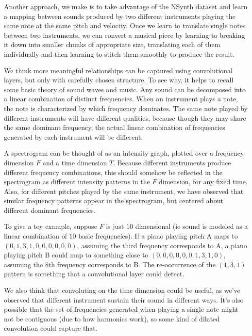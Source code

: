\documentclass{article}
\begin{document}
Another approach, we make is to take advantage of the NSynth dataset and learn a mapping between sounds produced by two different instruments playing the same note at the same pitch and velocity. Once we learn to translate single notes between two instruments, we can convert a musical piece by learning to breaking it down into smaller chunks of appropriate size, translating each of them individually and then learning to stitch them smoothly to produce the result.

We think more meaningful relationships can be captured using convolutional layers, but only with carefully chosen structure.
To see why, it helps to recall some basic theory of sound waves and music.
Any sound can be decomposed into a linear combination of distinct frequencies.
When an instrument plays a note, the note is characterized by which frequency dominates.
The same note played by different instruments will have different qualities, because though they may share the same dominant frequency, the actual linear combination of frequencies generated by each instrument will be different.

A spectrogram can be thought of as an intensity graph, plotted over a frequency dimension $F$ and a time dimension $T$.
Because different instruments produce different frequency combinations, this should somehow be reflected in the spectrogram as different intensity patterns in the $F$ dimension, for any fixed time.
Also, for different pitches played by the same instrument, we have observed that similar frequency patterns appear in the spectrogram, but centered about different dominant frequencies.

To give a toy example, suppose $F$ is just 10 dimensional (ie sound is modeled as a linear combination of 10 basic frequencies). If a piano playing pitch A maps to $(0, 1, 3, 1, 0, 0, 0, 0, 0, 0)$, assuming the third frequency corresponds to A, a piano playing pitch B could map to something close to $(0, 0, 0, 0, 0, 0, 1, 3, 1, 0)$, assuming the 8th frequency corresponds to B.  The re-occurrence of the $(1, 3, 1)$ pattern is something that a convolutional layer could detect.

We also think that convoluting on the time dimension could be useful, as we've observed that different instrument sustain their sound in different ways.  It's also possible that the set of frequencies generated when playing a single note might not be contiguous (due to how harmonics work), so some kind of dilated convolution could capture that.
\end{document}
